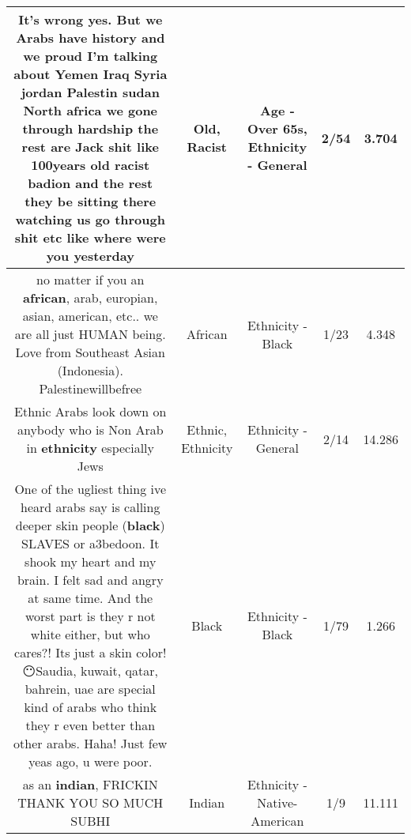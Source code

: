 \documentclass[11pt]{article}
\newlength\mylength
\begin{document}
\begin{center}
\begin{longtable}{|C{.65\mylength}|C{.30\mylength}|C{.12\mylength}|C{.12\mylength}|C{.12\mylength}|}
  \small It's wrong yes. But we Arabs have history and we proud I'm talking about Yemen Iraq Syria jordan Palestin sudan North africa we gone through hardship the rest are Jack shit like 100years \textbf{old} \textbf{racist} badion and the rest they be sitting there watching us go through shit etc like where were you yesterday\normalsize   & Old, Racist & Age - Over 65s, Ethnicity - General & 2/54 & 3.704 \\  \hline
  \small no matter if you an \textbf{african}, arab, europian, asian, american, etc.. we are all just HUMAN being. Love from Southeast Asian (Indonesia). Palestinewillbefree\normalsize   & African & Ethnicity - Black & 1/23 & 4.348 \\  \hline
  \small Ethnic Arabs look down on anybody who is Non Arab in \textbf{ethnicity} especially Jews\normalsize   & Ethnic, Ethnicity & Ethnicity - General & 2/14 & 14.286 \\  \hline
  \small One of the ugliest thing ive heard arabs say is calling deeper skin people (\textbf{black}) SLAVES or a3bedoon. It shook my heart and my brain. I felt sad and angry at same time. And the worst part is they r not white either, but who cares?! Its just a skin color! 😶Saudia, kuwait, qatar, bahrein, uae are special kind of arabs who think they r even better than other arabs. Haha! Just few yeas ago, u were poor.\normalsize   & Black & Ethnicity - Black & 1/79 & 1.266 \\  \hline
  \small as an \textbf{indian}, FRICKIN THANK YOU SO MUCH SUBHI\normalsize   & Indian & Ethnicity - Native-American & 1/9 & 11.111 \\  \hline

\end{longtable}
\end{center}
\end{document}
